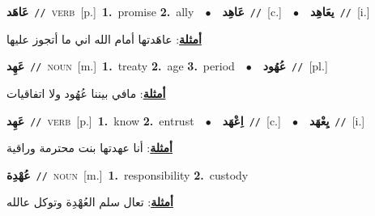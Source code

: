 \documentclass[10pt,a4paper,twoside]{article} %
\begin{document}
\begin{multicols}{2}
{\setlength\topsep{0pt}\textbf{\foreignlanguage{arabic}{عَاهَد}}\ {\color{gray}\texttt{//}\color{black}}\ \textsc{verb}\ [p.]\ \textbf{1.}~promise  \textbf{2.}~ally\ \ $\bullet$\ \ \setlength\topsep{0pt}\textbf{\foreignlanguage{arabic}{عَاهِد}}\ {\color{gray}\texttt{//}\color{black}}\ [c.]\ \ $\bullet$\ \ \setlength\topsep{0pt}\textbf{\foreignlanguage{arabic}{يعَاهِد}}\ {\color{gray}\texttt{//}\color{black}}\ [i.]\  \begin{flushright}\color{gray}\foreignlanguage{arabic}{\textbf{\underline{\foreignlanguage{arabic}{أمثلة}}}: عاهَدتها أمام الله اني ما أتجوز عليها}\end{flushright}\color{black}} \vspace{2mm}

{\setlength\topsep{0pt}\textbf{\foreignlanguage{arabic}{عَهِد}}\ {\color{gray}\texttt{//}\color{black}}\ \textsc{noun}\ [m.]\ \textbf{1.}~treaty  \textbf{2.}~age  \textbf{3.}~period\ \ $\bullet$\ \ \setlength\topsep{0pt}\textbf{\foreignlanguage{arabic}{عُهُود}}\ {\color{gray}\texttt{//}\color{black}}\ [pl.]\  \begin{flushright}\color{gray}\foreignlanguage{arabic}{\textbf{\underline{\foreignlanguage{arabic}{أمثلة}}}: مافي بيننا عُهُود ولا اتفاقيات}\end{flushright}\color{black}} \vspace{2mm}

{\setlength\topsep{0pt}\textbf{\foreignlanguage{arabic}{عَهِد}}\ {\color{gray}\texttt{//}\color{black}}\ \textsc{verb}\ [p.]\ \textbf{1.}~know  \textbf{2.}~entrust\ \ $\bullet$\ \ \setlength\topsep{0pt}\textbf{\foreignlanguage{arabic}{اِعْهَد}}\ {\color{gray}\texttt{//}\color{black}}\ [c.]\ \ $\bullet$\ \ \setlength\topsep{0pt}\textbf{\foreignlanguage{arabic}{يِعْهَد}}\ {\color{gray}\texttt{//}\color{black}}\ [i.]\  \begin{flushright}\color{gray}\foreignlanguage{arabic}{\textbf{\underline{\foreignlanguage{arabic}{أمثلة}}}: أنا عهدتها بنت محترمة وراقية}\end{flushright}\color{black}} \vspace{2mm}

{\setlength\topsep{0pt}\textbf{\foreignlanguage{arabic}{عُهْدِة}}\ {\color{gray}\texttt{//}\color{black}}\ \textsc{noun}\ [m.]\ \textbf{1.}~responsibility  \textbf{2.}~custody\  \begin{flushright}\color{gray}\foreignlanguage{arabic}{\textbf{\underline{\foreignlanguage{arabic}{أمثلة}}}: تعال سلم العُهْدِة وتوكل عالله}\end{flushright}\color{black}} \vspace{2mm}


\end{multicols}
\end{document}
